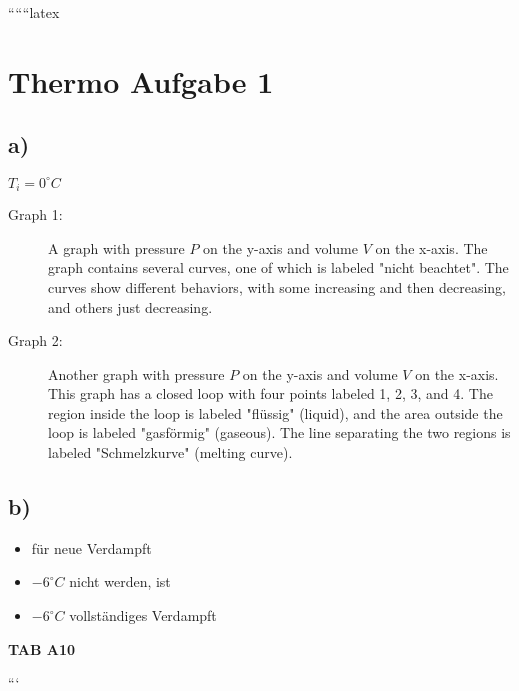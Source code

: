 
``````latex


\section*{Thermo Aufgabe 1}

\subsection*{a)}
$T_i = 0^\circ C$

\begin{description}
    \item[Graph 1:] A graph with pressure $P$ on the y-axis and volume $V$ on the x-axis. The graph contains several curves, one of which is labeled "nicht beachtet". The curves show different behaviors, with some increasing and then decreasing, and others just decreasing.
\end{description}

\begin{description}
    \item[Graph 2:] Another graph with pressure $P$ on the y-axis and volume $V$ on the x-axis. This graph has a closed loop with four points labeled 1, 2, 3, and 4. The region inside the loop is labeled "flüssig" (liquid), and the area outside the loop is labeled "gasförmig" (gaseous). The line separating the two regions is labeled "Schmelzkurve" (melting curve).
\end{description}

\subsection*{b)}
\begin{itemize}
    \item für neue Verdampft
    \item $-6^\circ C$ nicht werden, ist
    \item $-6^\circ C$ vollständiges Verdampft
\end{itemize}

\textbf{TAB A10}

```